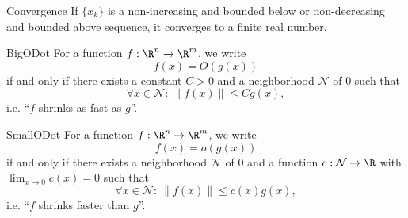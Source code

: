 \begin{lem}[Convergence]{Convergence}
    \vspace*{-0.1cm}
    If $\{x_k\}$ is a non-increasing and bounded below or non-decreasing and bounded above sequence, it converges to a finite real number.
\end{lem}

\begin{theo}[$O(\cdot)$]{BigODot}
    \vspace*{-0.1cm}
    For a function $f: \R^n \rightarrow \R^m$, we write 
    \begin{equation*}
        f(x) = O(g(x))
    \end{equation*} 
    if and only if there exists a constant $C > 0$ and a neighborhood $\mathcal{N}$ of $0$ such that 
    \begin{equation*}
        \forall x \in \mathcal{N}: \ \| f(x) \| \leq C g(x),
    \end{equation*} 
    i\@.e\@. ``$f$ shrinks as fast as $g$''.
\end{theo}

\begin{theo}[$o(\cdot)$]{SmallODot}
    \vspace*{-0.1cm}
    For a function $f: \R^n \rightarrow \R^m$, we write 
    \begin{equation*}
        f(x) = o(g(x))
    \end{equation*} 
    if and only if there exists a neighborhood $\mathcal{N}$ of $0$ and a function $c: \mathcal{N} \rightarrow \R$ with $\lim_{x \rightarrow 0} c(x) = 0$ such that 
    \begin{equation*}
        \forall x \in \mathcal{N}: \ \| f(x) \| \leq c(x) g(x),
    \end{equation*} 
    i\@.e\@. ``$f$ shrinks faster than $g$''.
\end{theo}